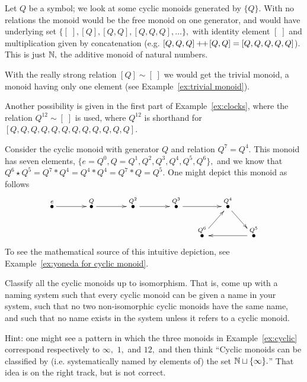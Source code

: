\documentclass[CT4S-EN-RU]{subfiles}
\begin{document}
\begin{exampleENG}\label{ex:cyclic}
Let $Q$ be a symbol; we look at some cyclic monoids generated by $\{Q\}.$ With no relations the monoid would be the free monoid on one generator, and would have underlying set $\{[\;],[Q],[Q,Q],[Q,Q,Q],\ldots\},$ with identity element $[\;]$ and multiplication given by concatenation (e.g. $[Q,Q,Q]+\!\!+\hspace{1pt}[Q,Q]=[Q,Q,Q,Q,Q]$). This is just ${\mathbb N},$ the additive monoid of natural numbers.

With the really strong relation $[Q]\sim[\;]$ we would get the trivial monoid, a monoid having only one element (see Example~\ref{ex:trivial monoid}).

Another possibility is given in the first part of Example~\ref{ex:clocks}, where the relation $Q^{12}\sim[\;]$ is used, where $Q^{12}$ is shorthand for $[Q,Q,Q,Q,Q,Q,Q,Q,Q,Q,Q,Q].$
\end{exampleENG}

\begin{exampleRUS}\label{ex:cyclic}
\end{exampleRUS}

\begin{exampleENG}\label{ex:cyclic monoid (7,4)}
Consider the cyclic monoid with generator $Q$ and relation $Q^7=Q^4.$ This monoid has seven elements, $\{e=Q^0,Q=Q^1, Q^2, Q^3, Q^4, Q^5, Q^6\},$ and we know that $Q^6\star Q^5=Q^7*Q^4=Q^4*Q^4=Q^7*Q=Q^5.$ One might depict this monoid as follows
$$\xymatrix@=15pt{
\LMO{e}\ar[rr]&&\LMO{Q}\ar[rr]&&\LMO{Q^2}\ar[rr]&&\LMO{Q^3}\ar[rr]&&\LMO{Q^4}\ar[dr]\\
&&&&&&&\LMO{Q^6}\ar[ur]&&\LMO{Q^5}\ar[ll]
}
$$
To see the mathematical source of this intuitive depiction, see Example~\ref{ex:yoneda for cyclic monoid}.
\end{exampleENG}

\begin{exampleRUS}\label{ex:cyclic monoid (7,4)}
\end{exampleRUS}

\begin{exerciseENG}\label{exc:classify cyclic}
Classify all the cyclic monoids up to isomorphism. That is, come up with a naming system such that every cyclic monoid can be given a name in your system, such that no two non-isomorphic cyclic monoids have the same name, and such that no name exists in the system unless it refers to a cyclic monoid.

Hint: one might see a pattern in which the three monoids in Example~\ref{ex:cyclic} correspond respectively to $\infty,$ $1,$ and $12,$ and then think “Cyclic monoids can be classified by (i.e. systematically named by elements of) the set ${\mathbb N}\sqcup\{\infty\}.$” That idea is on the right track, but is not correct.
\end{exerciseENG}
\end{document}
